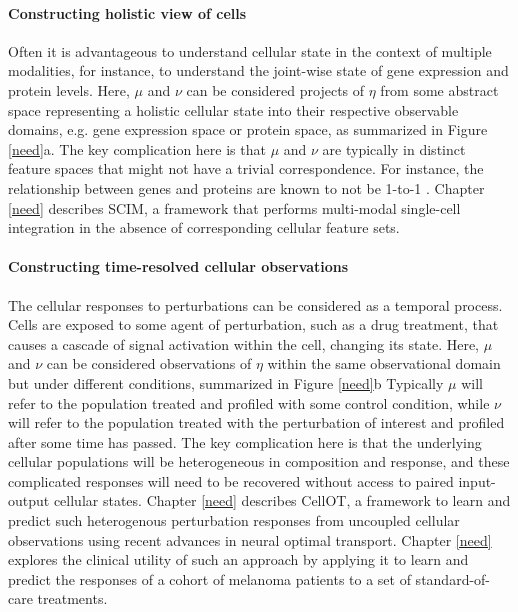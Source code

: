 \paragraph{Constructing holistic view of cells}
Often it is advantageous to understand cellular state in the context of multiple modalities,
for instance, to understand the joint-wise state of gene expression and protein levels.
Here, $\mu$ and $\nu$ can be considered projects of $\eta$ from some abstract space representing a holistic cellular state into their respective observable domains, e.g. gene expression space or protein space, as summarized in Figure \ref{need}a.
The key complication here is that $\mu$ and $\nu$ are typically in distinct feature spaces that might not have a trivial correspondence.
For instance, the relationship between genes and proteins are known to not be 1-to-1 \cite{need}.
Chapter \ref{need} describes SCIM, a framework that performs multi-modal single-cell integration in the absence of corresponding cellular feature sets.

\paragraph{Constructing time-resolved cellular observations}
The cellular responses to perturbations can be considered as a temporal process.
Cells are exposed to some agent of perturbation, such as a drug treatment, that causes a cascade of signal activation within the cell, changing its state.
Here, $\mu$ and $\nu$ can be considered observations of $\eta$ within the same observational domain but under different conditions, summarized in Figure \ref{need}b
Typically $\mu$ will refer to the population treated and profiled with some control condition, while $\nu$ will refer to the population treated with the perturbation of interest and profiled after some time has passed.
The key complication here is that the underlying cellular populations will be heterogeneous in composition and response, and these complicated responses will need to be recovered without access to paired input-output cellular states.
Chapter \ref{need} describes CellOT, a framework to learn and predict such heterogenous perturbation responses from uncoupled cellular observations using recent advances in neural optimal transport.
Chapter \ref{need} explores the clinical utility of such an approach by applying it to learn and predict the responses of a cohort of melanoma patients to a set of standard-of-care treatments.
